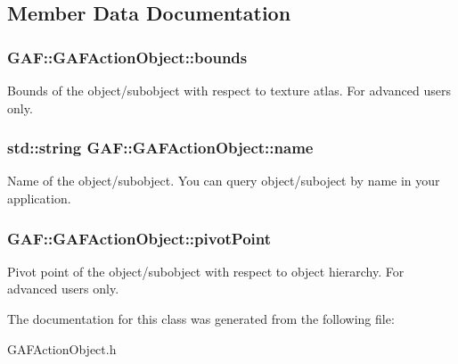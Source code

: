 \subsection{Member Data Documentation}
\hypertarget{class_g_a_f_1_1_g_a_f_action_object_a9c0d295e1fb13ee4f6393bb08084565c}{
\subsubsection[{bounds}]{ G\-A\-F\-::\-G\-A\-F\-Action\-Object\-::bounds}}\label{class_g_a_f_1_1_g_a_f_action_object_a9c0d295e1fb13ee4f6393bb08084565c}
Bounds of the object/subobject with respect to texture atlas. For advanced users only. \hypertarget{class_g_a_f_1_1_g_a_f_action_object_a696f101b3aebdf344632e81a95224643}{
\subsubsection[{name}]{\setlength{\rightskip}{0pt plus 5cm}std\-::string G\-A\-F\-::\-G\-A\-F\-Action\-Object\-::name}}\label{class_g_a_f_1_1_g_a_f_action_object_a696f101b3aebdf344632e81a95224643}
Name of the object/subobject. You can query object/suboject by name in your application. \hypertarget{class_g_a_f_1_1_g_a_f_action_object_a01c42a4efc8e307d1e4ac799fffaedff}{
\subsubsection[{pivot\-Point}]{ G\-A\-F\-::\-G\-A\-F\-Action\-Object\-::pivot\-Point}}\label{class_g_a_f_1_1_g_a_f_action_object_a01c42a4efc8e307d1e4ac799fffaedff}
Pivot point of the object/subobject with respect to object hierarchy. For advanced users only. 

The documentation for this class was generated from the following file\-:\begin{DoxyCompactItemize}
\item 
G\-A\-F\-Action\-Object.\-h\end{DoxyCompactItemize}
